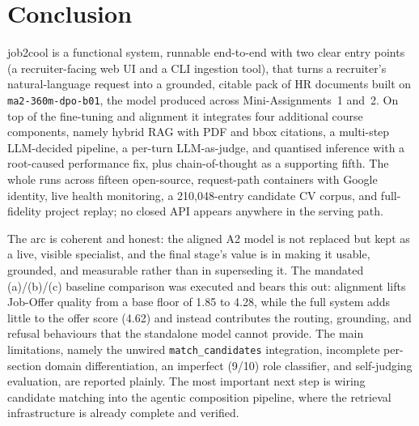 \section{Conclusion}

job2cool is a functional system, runnable end-to-end with two clear entry points (a
recruiter-facing web UI and a CLI ingestion tool), that turns a recruiter's natural-language
request into a grounded, citable pack of HR documents built on \verb|ma2-360m-dpo-b01|, the
model produced across Mini-Assignments~1 and~2. On top of the fine-tuning and alignment it
integrates four additional course components, namely hybrid RAG with PDF and bbox citations,
a multi-step LLM-decided pipeline, a per-turn LLM-as-judge, and quantised inference with a
root-caused performance fix, plus chain-of-thought as a supporting fifth. The whole runs
across fifteen open-source, request-path containers with Google identity, live health
monitoring, a 210,048-entry candidate CV corpus, and full-fidelity project replay; no closed
API appears anywhere in the serving path.

The arc is coherent and honest: the aligned A2 model is not replaced but kept as a live,
visible specialist, and the final stage's value is in making it usable, grounded, and
measurable rather than in superseding it. The mandated (a)/(b)/(c) baseline comparison was
executed and bears this out: alignment lifts Job-Offer quality from a base floor of 1.85 to
4.28, while the full system adds little to the offer score (4.62) and instead contributes the
routing, grounding, and refusal behaviours that the standalone model cannot provide. The main
limitations, namely the unwired \verb|match_candidates| integration, incomplete per-section
domain differentiation, an imperfect (9/10) role classifier, and self-judging evaluation, are
reported plainly. The most important next step is wiring candidate matching into the agentic
composition pipeline, where the retrieval infrastructure is already complete and verified.
